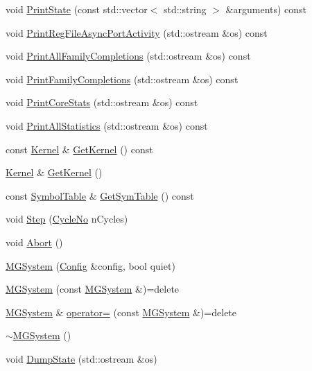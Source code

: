 \begin{DoxyCompactItemize}
void \hyperlink{class_simulator_1_1_m_g_system_aa8c99d0706de8bf84a5de8975715a593}{Print\+State} (const std\+::vector$<$ std\+::string $>$ \&arguments) const 
\item 
void \hyperlink{class_simulator_1_1_m_g_system_a05765ebef83c012240acfb15d5acf2d6}{Print\+Reg\+File\+Async\+Port\+Activity} (std\+::ostream \&os) const 
\item 
void \hyperlink{class_simulator_1_1_m_g_system_af82584c8fefb2a83d01084ec9c68adaf}{Print\+All\+Family\+Completions} (std\+::ostream \&os) const 
\item 
void \hyperlink{class_simulator_1_1_m_g_system_a2d29a2d1e0ce3286002856a1f4e89018}{Print\+Family\+Completions} (std\+::ostream \&os) const 
\item 
void \hyperlink{class_simulator_1_1_m_g_system_a7b0d5a94676972837dfd3c7e6fce8d86}{Print\+Core\+Stats} (std\+::ostream \&os) const 
\item 
void \hyperlink{class_simulator_1_1_m_g_system_ab6c36f6d9f20261d5be77ec65ed9e1ff}{Print\+All\+Statistics} (std\+::ostream \&os) const 
\item 
const \hyperlink{class_simulator_1_1_kernel}{Kernel} \& \hyperlink{class_simulator_1_1_m_g_system_a93dcedf29365892cff8900a555d97a83}{Get\+Kernel} () const 
\item 
\hyperlink{class_simulator_1_1_kernel}{Kernel} \& \hyperlink{class_simulator_1_1_m_g_system_a3f167c3183128c73a2b2b5ed5441764b}{Get\+Kernel} ()
\item 
const \hyperlink{class_simulator_1_1_symbol_table}{Symbol\+Table} \& \hyperlink{class_simulator_1_1_m_g_system_af1bda4428111fc40ea873825937aa65f}{Get\+Sym\+Table} () const 
\item 
void \hyperlink{class_simulator_1_1_m_g_system_ad9e269743b27d21e37323fa150b35397}{Step} (\hyperlink{namespace_simulator_a928f1e2101eba21bb0fe409e8c9ce573}{Cycle\+No} n\+Cycles)
\item 
void \hyperlink{class_simulator_1_1_m_g_system_ab8d4d93c02039747a509a825545ae0c0}{Abort} ()
\item 
\hyperlink{class_simulator_1_1_m_g_system_a2892e11681fffba8f75f1aa228f93465}{M\+G\+System} (\hyperlink{class_config}{Config} \&config, bool quiet)
\item 
\hyperlink{class_simulator_1_1_m_g_system_ab7889c3c41f5849898b5a46921ee4b8b}{M\+G\+System} (const \hyperlink{class_simulator_1_1_m_g_system}{M\+G\+System} \&)=delete
\item 
\hyperlink{class_simulator_1_1_m_g_system}{M\+G\+System} \& \hyperlink{class_simulator_1_1_m_g_system_aed5750793c6a16c307928974ceb2c485}{operator=} (const \hyperlink{class_simulator_1_1_m_g_system}{M\+G\+System} \&)=delete
\item 
\hyperlink{class_simulator_1_1_m_g_system_a1ea24e636f32f64ef8a4401c9a91f09e}{$\sim$\+M\+G\+System} ()
\item 
void \hyperlink{class_simulator_1_1_m_g_system_a43a489ab7c6d18a8f6ca185b44d5fbad}{Dump\+State} (std\+::ostream \&os)
\end{DoxyCompactItemize}



